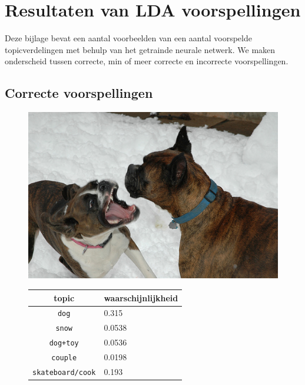 \chapter{Resultaten van LDA voorspellingen}
\label{app:LDApredictions}
Deze bijlage bevat een aantal voorbeelden van een aantal voorspelde topicverdelingen met behulp van het getrainde neurale netwerk. We maken onderscheid tussen correcte, min of meer correcte en incorrecte voorspellingen.
\section{Correcte voorspellingen}
\begin{figure}[!htb]
    \centering
    \begin{minipage}[t]{.5\linewidth}
    \centering
    \vspace{0pt}
    \includegraphics[width=\textwidth]{Images/LDA/3348384389.jpg}
    \end{minipage}\hfill
    \begin{minipage}[t]{.5\textwidth}
    \centering
    \vspace{0pt}
    \begin{tabular}{cl}
            topic                           & waarschijnlijkheid\\
            \hline
            \texttt{dog}             & 0.315 \\
            \texttt{snow}                   & 0.0538 \\
            \texttt{dog+toy} & 0.0536\\
            \texttt{couple}                  & 0.0198 \\
            \texttt{skateboard/cook}           & 0.193 \\
            \hline
        \end{tabular}
    \end{minipage}
\end{figure}

